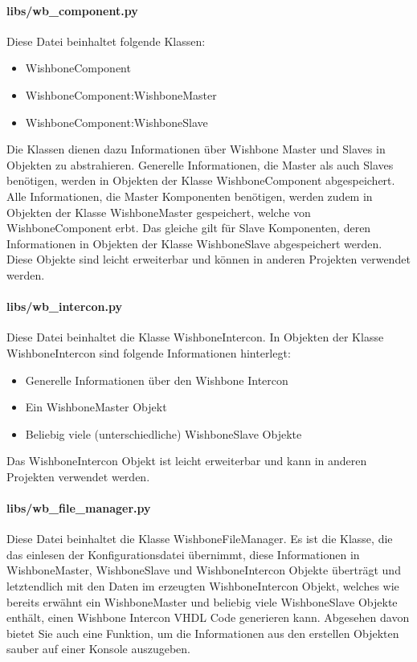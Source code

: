 \documentclass{article}
\newcommand{\nl}{\leavevmode\newline}
\begin{document}
\paragraph{libs/wb\_component.py}\nl
Diese Datei beinhaltet folgende Klassen:
\begin{itemize}
\item WishboneComponent
\item WishboneComponent:WishboneMaster
\item WishboneComponent:WishboneSlave
\end{itemize}
Die Klassen dienen dazu Informationen über Wishbone Master und Slaves in Objekten zu abstrahieren.
Generelle Informationen, die Master als auch Slaves benötigen, werden in Objekten der Klasse WishboneComponent abgespeichert. Alle Informationen, die Master Komponenten benötigen, werden zudem in Objekten der Klasse WishboneMaster gespeichert, welche von WishboneComponent erbt. Das gleiche gilt für Slave Komponenten, deren Informationen in Objekten der Klasse WishboneSlave abgespeichert werden. Diese Objekte sind leicht erweiterbar und können in anderen Projekten verwendet werden.
\paragraph{libs/wb\_intercon.py}\nl
Diese Datei beinhaltet die Klasse WishboneIntercon. In Objekten der Klasse WishboneIntercon sind folgende Informationen hinterlegt:
\begin{itemize}
\item Generelle Informationen über den Wishbone Intercon
\item Ein WishboneMaster Objekt
\item Beliebig viele (unterschiedliche) WishboneSlave Objekte
\end{itemize}
Das WishboneIntercon Objekt ist leicht erweiterbar und kann in anderen Projekten verwendet werden.
\paragraph{libs/wb\_file\_manager.py}\nl 
Diese Datei beinhaltet die Klasse WishboneFileManager. Es ist die Klasse, die das einlesen der Konfigurationsdatei übernimmt, diese Informationen in WishboneMaster, WishboneSlave und WishboneIntercon Objekte überträgt und letztendlich mit den Daten im erzeugten WishboneIntercon Objekt, welches wie bereits erwähnt ein WishboneMaster und beliebig viele WishboneSlave Objekte enthält, einen Wishbone Intercon VHDL Code generieren kann. Abgesehen davon bietet Sie auch eine Funktion, um die Informationen aus den erstellen Objekten sauber auf einer Konsole auszugeben.
\end{document}
